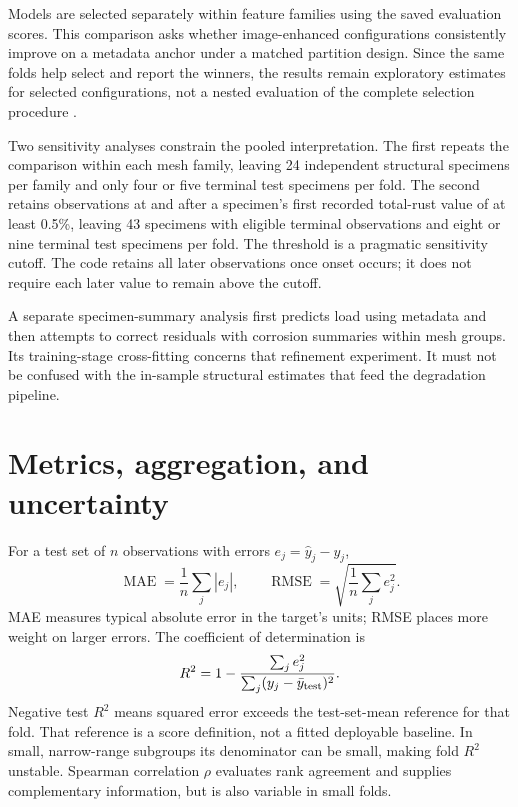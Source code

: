 Models are selected separately within feature families using the saved evaluation scores. This comparison asks whether image-enhanced configurations consistently improve on a metadata anchor under a matched partition design. Since the same folds help select and report the winners, the results remain exploratory estimates for selected configurations, not a nested evaluation of the complete selection procedure \citep{cawley2010}.

Two sensitivity analyses constrain the pooled interpretation. The first repeats the comparison within each mesh family, leaving 24 independent structural specimens per family and only four or five terminal test specimens per fold. The second retains observations at and after a specimen's first recorded total-rust value of at least 0.5\%, leaving 43 specimens with eligible terminal observations and eight or nine terminal test specimens per fold. The threshold is a pragmatic sensitivity cutoff. The code retains all later observations once onset occurs; it does not require each later value to remain above the cutoff.

A separate specimen-summary analysis first predicts load using metadata and then attempts to correct residuals with corrosion summaries within mesh groups. Its training-stage cross-fitting concerns that refinement experiment. It must not be confused with the in-sample structural estimates that feed the degradation pipeline.

\section{Metrics, aggregation, and uncertainty}\label{sec:metrics}
For a test set of $n$ observations with errors $e_j=\widehat y_j-y_j$,
\begin{equation}
\operatorname{MAE}=\frac{1}{n}\sum_j |e_j|,\qquad
\operatorname{RMSE}=\sqrt{\frac{1}{n}\sum_j e_j^2}.
\end{equation}
MAE measures typical absolute error in the target's units; RMSE places more weight on larger errors. The coefficient of determination is
\begin{equation}
R^2=1-\frac{\sum_j e_j^2}{\sum_j(y_j-\bar y_{\rm test})^2}.
\end{equation}
Negative test $R^2$ means squared error exceeds the test-set-mean reference for that fold. That reference is a score definition, not a fitted deployable baseline. In small, narrow-range subgroups its denominator can be small, making fold $R^2$ unstable. Spearman correlation $\rho$ evaluates rank agreement and supplies complementary information, but is also variable in small folds.

